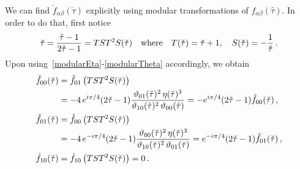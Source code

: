 \documentclass[12pt,a4paper]{article}
\newcommand{\I}{\mathrm{i}}
\def\({\left(}
\def\){\right)}
\newcommand{\non}{\nonumber}
\newcommand{\vt}{\vartheta}
\def\I{i}
\def\htau{\hat\tau}
\def\ctau{\check\tau}
\begin{document}
We can find $\check f_{\alpha \beta} (\ctau)$ explicitly using modular transformations
of $f_{\alpha \beta} (\htau)$. In order to do that, first notice
\begin{align}
\htau= {\ctau-1\over 2\ctau -1} = T S T^2 S (\ctau)
\quad \text{where} \quad
T(\ctau) = \ctau + 1,
\quad
S(\ctau) = - {1 \over \ctau}\, .
\end{align}
Upon using~\eqref{modularEta}-\eqref{modularTheta} accordingly, we obtain
\begin{subequations} \label{Mobiusf}
\begin{align}
\check f_{00}(\ctau)
&=
\hat f_{01} \(T S T^2 S (\ctau)  \) \non
\\
&=
-4 \,e^{\I \pi/4} (2 \ctau-1)  {\vt_{01}(\ctau)^2\,\eta(\ctau)^3 \over \vt_{10}(\ctau)^2 \,\vt_{00}(\ctau)}
=
-e^{\I \pi/ 4} (2 \ctau -1) \hat f_{00} (\ctau) \, ,
\\
\check f_{01}(\ctau)
&=
\hat f_{00} \(T S T^2 S (\ctau)  \)  \non
\\
&=
-4 \,e^{- \I \pi/4} (2 \ctau-1)  {\vt_{00}(\ctau)^2\,\eta(\ctau)^3 \over \vt_{10}(\ctau)^2 \,\vt_{01}(\ctau)}
=
e^{-\I \pi/ 4} (2 \ctau -1) \hat f_{01} (\ctau) \, ,
\\
\check f_{10}(\ctau)
&=
\hat f_{10} \(T S T^2 S (\ctau)  \) = 0  \, .
\end{align}
\end{subequations}

\newcommand{\ZZhQ}{{\mathcal Z}^{(h,Q)}}
\end{document}
